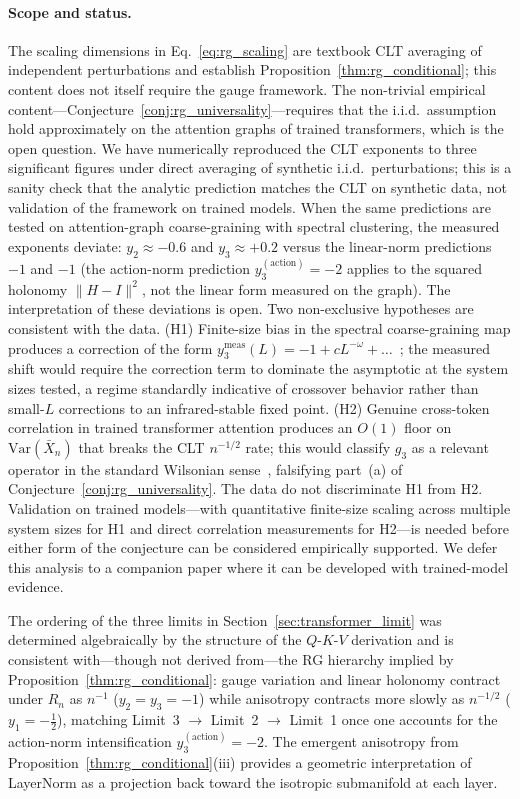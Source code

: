 \documentclass[twoside,11pt]{article}
\begin{document}
\paragraph{Scope and status.}
The scaling dimensions in Eq.~\eqref{eq:rg_scaling} are textbook CLT averaging of independent perturbations and establish Proposition~\ref{thm:rg_conditional}; this content does not itself require the gauge framework. The non-trivial empirical content---Conjecture~\ref{conj:rg_universality}---requires that the i.i.d.\ assumption hold approximately on the attention graphs of trained transformers, which is the open question. We have numerically reproduced the CLT exponents to three significant figures under direct averaging of synthetic i.i.d.\ perturbations; this is a sanity check that the analytic prediction matches the CLT on synthetic data, not validation of the framework on trained models. When the same predictions are tested on attention-graph coarse-graining with spectral clustering, the measured exponents deviate: $y_2 \approx -0.6$ and $y_3 \approx +0.2$ versus the linear-norm predictions $-1$ and $-1$ (the action-norm prediction $y_3^{(\mathrm{action})} = -2$ applies to the squared holonomy $\|H-I\|^2$, not the linear form measured on the graph). The interpretation of these deviations is open. Two non-exclusive hypotheses are consistent with the data. (H1) Finite-size bias in the spectral coarse-graining map produces a correction of the form $y_3^{\mathrm{meas}}(L) = -1 + c L^{-\omega} + \ldots$~\citep{Cardy1996}; the measured shift would require the correction term to dominate the asymptotic at the system sizes tested, a regime standardly indicative of crossover behavior rather than small-$L$ corrections to an infrared-stable fixed point. (H2) Genuine cross-token correlation in trained transformer attention produces an $O(1)$ floor on $\mathrm{Var}(\bar{X}_n)$ that breaks the CLT $n^{-1/2}$ rate; this would classify $g_3$ as a relevant operator in the standard Wilsonian sense~\citep{Cardy1996,goldenfeld1992lectures}, falsifying part~(a) of Conjecture~\ref{conj:rg_universality}. The data do not discriminate H1 from H2. Validation on trained models---with quantitative finite-size scaling across multiple system sizes for H1 and direct correlation measurements for H2---is needed before either form of the conjecture can be considered empirically supported. We defer this analysis to a companion paper where it can be developed with trained-model evidence.

The ordering of the three limits in Section~\ref{sec:transformer_limit} was determined algebraically by the structure of the $Q$-$K$-$V$ derivation and is consistent with---though not derived from---the RG hierarchy implied by Proposition~\ref{thm:rg_conditional}: gauge variation and linear holonomy contract under $R_n$ as $n^{-1}$ ($y_2 = y_3 = -1$) while anisotropy contracts more slowly as $n^{-1/2}$ ($y_1 = -\tfrac{1}{2}$), matching Limit~3 $\to$ Limit~2 $\to$ Limit~1 once one accounts for the action-norm intensification $y_3^{(\mathrm{action})} = -2$. The emergent anisotropy from Proposition~\ref{thm:rg_conditional}(iii) provides a geometric interpretation of LayerNorm as a projection back toward the isotropic submanifold at each layer.
\end{document}
